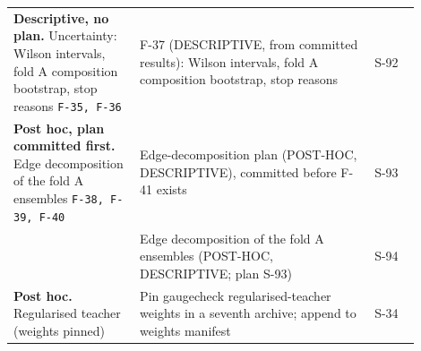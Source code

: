 {\begin{longtable}{R{0.28\linewidth} R{0.52\linewidth} R{0.10\linewidth}}
\textbf{Descriptive, no plan.} Uncertainty: Wilson intervals, fold A composition bootstrap, stop reasons \newline \footnotesize{\texttt{F-35, F-36}} & F-37 (DESCRIPTIVE, from committed results): Wilson intervals, fold A composition bootstrap, stop reasons & S-92 \\
\textbf{Post hoc, plan committed first.} Edge decomposition of the fold A ensembles \newline \footnotesize{\texttt{F-38, F-39, F-40}} & Edge-decomposition plan (POST-HOC, DESCRIPTIVE), committed before F-41 exists & S-93 \\
 & Edge decomposition of the fold A ensembles (POST-HOC, DESCRIPTIVE; plan S-93) & S-94 \\
\textbf{Post hoc.} Regularised teacher (weights pinned) & Pin gaugecheck regularised-teacher weights in a seventh archive; append to weights manifest & S-34 \\
\bottomrule
\end{longtable}}